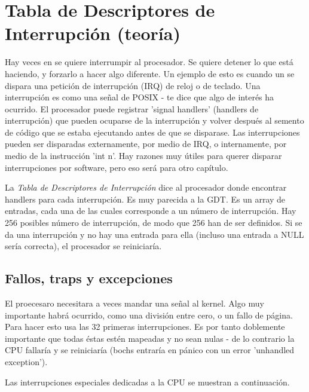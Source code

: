 \documentclass{report}
\begin{document}
\section{Tabla de Descriptores de Interrupción (teoría)}

Hay veces en se quiere interrumpir al procesador. Se quiere detener lo que está haciendo, y forzarlo a hacer algo diferente. Un ejemplo de esto es cuando un se dispara una petición de interrupción (IRQ) de reloj o de teclado. Una interrupción es como una señal de POSIX - te dice que algo de interés ha ocurrido. El procesador puede registrar 'signal handlers' (handlers de interrupción) que pueden ocuparse de la interrupción y volver después al semento de código que se estaba ejecutando antes de que se disparase. Las interrupciones pueden ser disparadas externamente, por medio de IRQ, o internamente, por medio de la instrucción 'int n'. Hay razones muy útiles para querer disparar interrupciones por software, pero eso será para otro capítulo.

La \textit{Tabla de Descriptores de Interrupción} dice al procesador donde encontrar handlers para cada interrupción. Es muy parecida a la GDT. Es un array de entradas, cada una de las cuales corresponde a un número de interrupción. Hay 256 posibles número de interrupción, de modo que 256 han de ser definidos. Si se da una interrupción y no hay una entrada para ella (incluso una entrada a NULL sería correcta), el procesador se reiniciaría.

\subsection{Fallos, traps y excepciones}

El proecesaro necesitara a veces mandar una señal al kernel. Algo muy importante habrá ocurrido, como una división entre cero, o un fallo de página. Para hacer esto usa las 32 primeras interrupciones. Es por tanto doblemente importante que todas éstas estén mapeadas y no sean nulas - de lo contrario la CPU fallaría y se reiniciaría (bochs entraría en pánico con un error 'unhandled exception').

Las interrupciones especiales dedicadas a la CPU se muestran a continuación.
\end{document}

